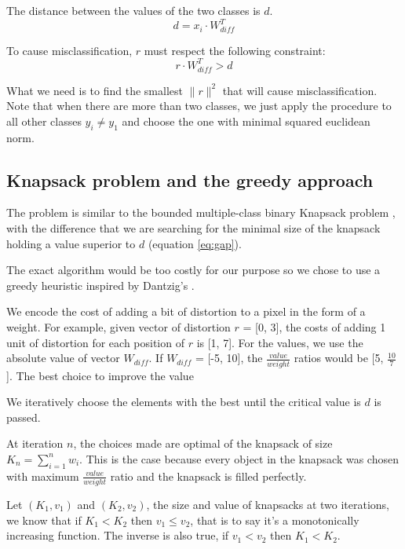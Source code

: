 \documentclass{article} %
\begin{document}
The distance between the values of the two classes is $d$.
\begin{equation}
\label{eq:gap}
  d = x_i \cdot W_{diff}^T
\end{equation}


To cause misclassification, $r$ must respect the following constraint:
\begin{equation}
\label{eq:noise_threshold}
  r \cdot W_{diff}^T > d
\end{equation}

What we need is to find the smallest $ \lVert{r} \rVert^2$ that will cause
misclassification. Note that when there are more than two classes, we just
apply the procedure to all other classes $y_i \neq y_1$ and choose the one
with minimal squared euclidean norm.


\subsection{Knapsack problem and the greedy approach}

The problem is similar to the bounded multiple-class binary Knapsack problem
\citep{vanderbeck_extending_2002}, with the difference that we are searching
for the minimal size of the knapsack holding a value superior to $d$ (equation
\ref{eq:gap}).

The exact algorithm would be too costly for our purpose so we chose to use a
greedy heuristic inspired by Dantzig's \citep{dantzig_discrete-variable_1957}.

We encode the cost of adding a bit of distortion to a pixel in the form of a
weight. For example, given vector of distortion $r$ = [0, 3], the costs of
adding 1 unit of distortion for each position of $r$ is [1, 7]. For the values,
we use the absolute value of vector $W_{diff}$. If $W_{diff}$ = [-5, 10], the 
$\frac {value} {weight}$ ratios would be [5, $\frac{10}{7}$]. The best choice
to improve the value 

We iteratively choose the elements with the best until
the critical value is $d$ is passed.

At iteration $n$, the choices made are optimal of the knapsack of size
$K_n = \sum\limits_{i=1}^n w_i$. This is the case because every object in the
knapsack was chosen with maximum $\frac{value} {weight}$ ratio and the knapsack
is filled perfectly.

Let $(K_1, v_1)$ and $(K_2, v_2)$, the size and value of knapsacks at two
iterations, we know that if $K_1 < K_2$ then $v_1 \leq v_2$, that is to say
it's a monotonically increasing function. The inverse is also true, if
$v_1 < v_2$ then $K_1 < K_2$.
\end{document}
